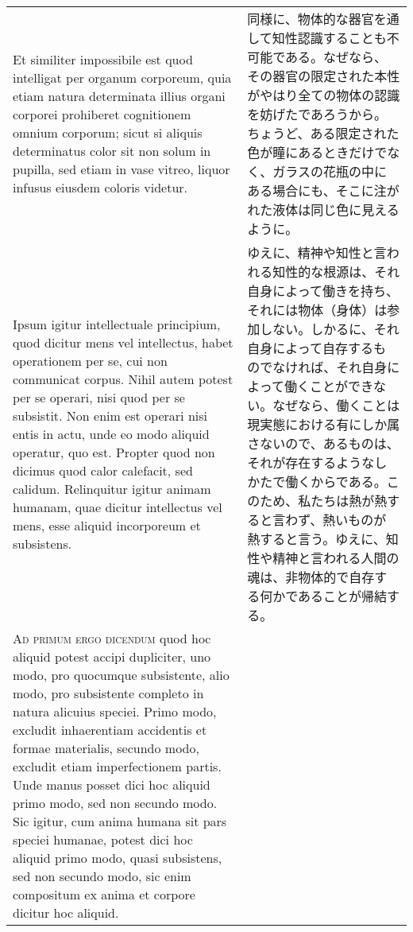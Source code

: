 \documentclass[10pt]{jsarticle} %
\begin{document}
\begin{longtable}{p{21em}p{21em}}
\\


Et similiter impossibile est quod
intelligat per organum corporeum, quia etiam natura determinata illius
organi corporei prohiberet cognitionem omnium corporum; sicut si
aliquis determinatus color sit non solum in pupilla, sed etiam in vase
vitreo, liquor infusus eiusdem coloris videtur. 


&

同様に、物体的な器官を通して知性認識することも不可能である。なぜなら、
その器官の限定された本性がやはり全ての物体の認識を妨げたであろうから。
ちょうど、ある限定された色が瞳にあるときだけでなく、ガラスの花瓶の中に
ある場合にも、そこに注がれた液体は同じ色に見えるように。


\\

Ipsum igitur intellectuale principium, quod dicitur mens vel
intellectus, habet operationem per se, cui non communicat
corpus. Nihil autem potest per se operari, nisi quod per se
subsistit. Non enim est operari nisi entis in actu, unde eo modo
aliquid operatur, quo est. Propter quod non dicimus quod calor
calefacit, sed calidum. Relinquitur igitur animam humanam, quae
dicitur intellectus vel mens, esse aliquid incorporeum et subsistens.


&

ゆえに、精神や知性と言われる知性的な根源は、それ自身によって働きを持ち、
それには物体（身体）は参加しない。しかるに、それ自身によって自存するも
のでなければ、それ自身によって働くことができない。なぜなら、働くことは
現実態における有にしか属さないので、あるものは、それが存在するようなし
かたで働くからである。このため、私たちは熱が熱すると言わず、熱いものが
熱すると言う。ゆえに、知性や精神と言われる人間の魂は、非物体的で自存す
る何かであることが帰結する。



\\


{\scshape Ad primum ergo dicendum} quod hoc aliquid potest accipi
dupliciter, uno modo, pro quocumque subsistente, alio modo, pro
subsistente completo in natura alicuius speciei. Primo modo, excludit
inhaerentiam accidentis et formae materialis, secundo modo, excludit
etiam imperfectionem partis. Unde manus posset dici hoc aliquid primo
modo, sed non secundo modo. Sic igitur, cum anima humana sit pars
speciei humanae, potest dici hoc aliquid primo modo, quasi subsistens,
sed non secundo modo, sic enim compositum ex anima et corpore dicitur
hoc aliquid.



\end{longtable}
\end{document}
